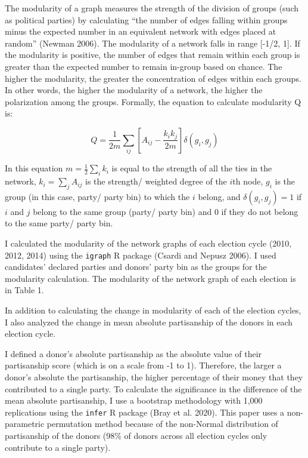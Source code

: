 \documentclass[12pt,]{article}
\begin{document}
The modularity of a graph measures the strength of the division of
groups (such as political parties) by calculating ``the number of edges
falling within groups minus the expected number in an equivalent network
with edges placed at random'' (Newman 2006). The modularity of a network
falls in range {[}-1/2, 1{]}. If the modularity is positive, the number
of edges that remain within each group is greater than the expected
number to remain in-group based on chance. The higher the modularity,
the greater the concentration of edges within each groups. In other
words, the higher the modularity of a network, the higher the
polarization among the groups. Formally, the equation to calculate
modularity Q is:

\[Q = \frac{1}{2m} \sum_{ij}\left[A_{ij} - \frac{k_{i}k_{j}}{2m} \right]\delta(g_{i},g_{j})\]

In this equation \(m = \frac{1}{2}\sum_{i}k_{i}\) is equal to the
strength of all the ties in the network, \(k_{i}=\sum_{j}A_{ij}\) is the
strength/ weighted degree of the \(i\)th node, \(g_{i}\) is the group
(in this case, party/ party bin) to which the \(i\) belong, and
\(\delta(g_{i},g_{j}) = 1\) if \(i\) and \(j\) belong to the same group
(party/ party bin) and 0 if they do not belong to the same party/ party
bin.

I calculated the modularity of the network graphs of each election cycle
(2010, 2012, 2014) using the \texttt{igraph} R package (Csardi and
Nepusz 2006). I used candidates' declared parties and donors' party bin
as the groups for the modularity calculation. The modularity of the
network graph of each election is in Table 1.

In addition to calculating the change in modularity of each of the
election cycles, I also analyzed the change in mean absolute
partisanship of the donors in each election cycle.

I defined a donor's absolute partisanship as the absolute value of their
partisanship score (which is on a scale from -1 to 1). Therefore, the
larger a donor's absolute the partisanship, the higher percentage of
their money that they contributed to a single party. To calculate the
significance in the difference of the mean absolute partisanship, I use
a bootstrap methodology with 1,000 replications using the \texttt{infer}
R package (Bray et al. 2020). This paper uses a non-parametric
permutation method because of the non-Normal distribution of
partisanship of the donors (98\% of donors across all election cycles
only contribute to a single party).
\end{document}
